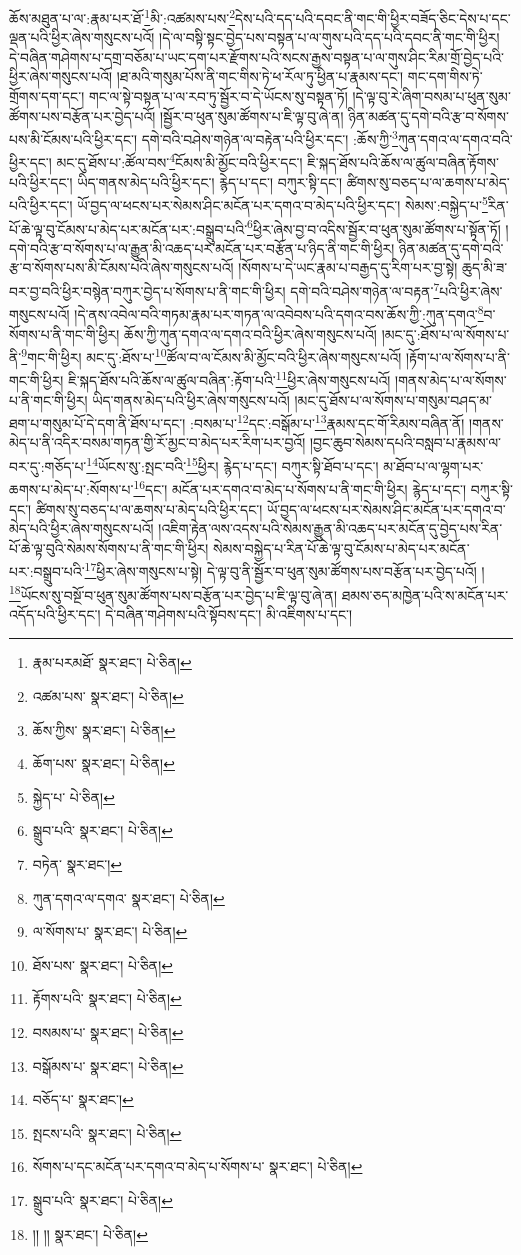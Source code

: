 ཆོས་མཐུན་པ་ལ་:རྣམ་པར་ཐོ་\footnote{རྣམ་པརམཐོ་  སྣར་ཐང་།  པེ་ཅིན། }མི་:འཚམས་པས་\footnote{འཚམ་པས་  སྣར་ཐང་།  པེ་ཅིན། }དེས་པའི་དད་པའི་དབང་ནི་གང་གི་ཕྱིར་བཟོད་ཅིང་དེས་པ་དང་ལྡན་པའི་ཕྱིར་ཞེས་གསུངས་པའོ། །དེ་ལ་བསྟི་སྟང་བྱེད་པས་བསྟན་པ་ལ་གུས་པའི་དད་པའི་དབང་ནི་གང་གི་ཕྱིར། དེ་བཞིན་གཤེགས་པ་དགྲ་བཅོམ་པ་ཡང་དག་པར་རྫོགས་པའི་སངས་རྒྱས་བསྟན་པ་ལ་གུས་ཤིང་རིམ་གྲོ་བྱེད་པའི་ཕྱིར་ཞེས་གསུངས་པའོ། །ཐ་མའི་གསུམ་པོས་ནི་གང་གིས་ཏེ་ཕ་རོལ་ཏུ་ཕྱིན་པ་རྣམས་དང་། གང་དག་གིས་ཏེ་གྲོགས་དག་དང་། གང་ལ་སྟེ་བསྟན་པ་ལ་རབ་ཏུ་སྦྱོར་བ་དེ་ཡོངས་སུ་བསྟན་ཏོ། །དེ་ལྟ་བུ་རེ་ཞིག་བསམ་པ་ཕུན་སུམ་ཚོགས་པས་བརྩོན་པར་བྱེད་པའོ། །སྦྱོར་བ་ཕུན་སུམ་ཚོགས་པ་ཇི་ལྟ་བུ་ཞེ་ན། ཉིན་མཚན་དུ་དགེ་བའི་རྩ་བ་སོགས་པས་མི་ངོམས་པའི་ཕྱིར་དང་། དགེ་བའི་བཤེས་གཉེན་ལ་བརྟེན་པའི་ཕྱིར་དང་། :ཆོས་ཀྱི་\footnote{ཆོས་ཀྱིས་  སྣར་ཐང་།  པེ་ཅིན། }ཀུན་དགའ་ལ་དགའ་བའི་ཕྱིར་དང་། མང་དུ་ཐོས་པ་:ཚོལ་བས་\footnote{ཆོག་པས་  སྣར་ཐང་།  པེ་ཅིན། }ངོམས་མི་མྱོང་བའི་ཕྱིར་དང་། ཇི་སྐད་ཐོས་པའི་ཆོས་ལ་ཚུལ་བཞིན་རྟོགས་པའི་ཕྱིར་དང་། ཡིད་གནས་མེད་པའི་ཕྱིར་དང་། རྙེད་པ་དང་། བཀུར་སྟི་དང་། ཚིགས་སུ་བཅད་པ་ལ་ཆགས་པ་མེད་པའི་ཕྱིར་དང་། ཡོ་བྱད་ལ་ཕངས་པར་སེམས་ཤིང་མངོན་པར་དགའ་བ་མེད་པའི་ཕྱིར་དང་། སེམས་:བསྐྱེད་པ་\footnote{སྐྱེད་པ་  པེ་ཅིན། }རིན་པོ་ཆེ་ལྟ་བུ་ངོམས་པ་མེད་པར་མངོན་པར་:བསྒྲུབ་པའི་\footnote{སྒྲུབ་པའི་  སྣར་ཐང་།  པེ་ཅིན། }ཕྱིར་ཞེས་བྱ་བ་འདིས་སྦྱོར་བ་ཕུན་སུམ་ཚོགས་པ་སྟོན་ཏོ། །དགེ་བའི་རྩ་བ་སོགས་པ་ལ་རྒྱུན་མི་འཆད་པར་མངོན་པར་བརྩོན་པ་ཉིད་ནི་གང་གི་ཕྱིར། ཉིན་མཚན་དུ་དགེ་བའི་རྩ་བ་སོགས་པས་མི་ངོམས་པའི་ཞེས་གསུངས་པའོ། །སོགས་པ་དེ་ཡང་རྣམ་པ་བརྒྱད་དུ་རིག་པར་བྱ་སྟེ། ཆུད་མི་ཟ་བར་བྱ་བའི་ཕྱིར་བསྙེན་བཀུར་བྱེད་པ་སོགས་པ་ནི་གང་གི་ཕྱིར། དགེ་བའི་བཤེས་གཉེན་ལ་བརྟན་\footnote{བཏེན་  སྣར་ཐང་། }པའི་ཕྱིར་ཞེས་གསུངས་པའོ། །དེ་ནས་འབེལ་བའི་གཏམ་རྣམ་པར་གཏན་ལ་འབེབས་པའི་དགའ་བས་ཆོས་ཀྱི་:ཀུན་དགའ་\footnote{ཀུན་དགའ་ལ་དགའ་  སྣར་ཐང་།  པེ་ཅིན། }བ་སོགས་པ་ནི་གང་གི་ཕྱིར། ཆོས་ཀྱི་ཀུན་དགའ་ལ་དགའ་བའི་ཕྱིར་ཞེས་གསུངས་པའོ། །མང་དུ་:ཐོས་པ་ལ་སོགས་པ་ནི་\footnote{ལ་སོགས་པ་  སྣར་ཐང་།  པེ་ཅིན། }གང་གི་ཕྱིར། མང་དུ་:ཐོས་པ་\footnote{ཐོས་པས་  སྣར་ཐང་།  པེ་ཅིན། }ཚོལ་བ་ལ་ངོམས་མི་མྱོང་བའི་ཕྱིར་ཞེས་གསུངས་པའོ། །རྟོག་པ་ལ་སོགས་པ་ནི་གང་གི་ཕྱིར། ཇི་སྐད་ཐོས་པའི་ཆོས་ལ་ཚུལ་བཞིན་:རྟོག་པའི་\footnote{རྟོགས་པའི་  སྣར་ཐང་།  པེ་ཅིན། }ཕྱིར་ཞེས་གསུངས་པའོ། །གནས་མེད་པ་ལ་སོགས་པ་ནི་གང་གི་ཕྱིར། ཡིད་གནས་མེད་པའི་ཕྱིར་ཞེས་གསུངས་པའོ། །མང་དུ་ཐོས་པ་ལ་སོགས་པ་གསུམ་བཤད་མ་ཐག་པ་གསུམ་པོ་དེ་དག་ནི་ཐོས་པ་དང་། :བསམ་པ་\footnote{བསམས་པ་  སྣར་ཐང་།  པེ་ཅིན། }དང་:བསྒོམ་པ་\footnote{བསྒོམས་པ་  སྣར་ཐང་།  པེ་ཅིན། }རྣམས་དང་གོ་རིམས་བཞིན་ནོ། །གནས་མེད་པ་ནི་འདིར་བསམ་གཏན་གྱི་རོ་མྱང་བ་མེད་པར་རིག་པར་བྱའོ། །བྱང་ཆུབ་སེམས་དཔའི་བསླབ་པ་རྣམས་ལ་བར་དུ་:གཅོད་པ་\footnote{བཅོད་པ་  སྣར་ཐང་། }ཡོངས་སུ་:སྤང་བའི་\footnote{སྤངས་པའི་  སྣར་ཐང་།  པེ་ཅིན། }ཕྱིར། རྙེད་པ་དང་། བཀུར་སྟི་ཐོབ་པ་དང་། མ་ཐོབ་པ་ལ་ལྷག་པར་ཆགས་པ་མེད་པ་:སོགས་པ་\footnote{སོགས་པ་དང་མངོན་པར་དགའ་བ་མེད་པ་སོགས་པ་  སྣར་ཐང་།  པེ་ཅིན། }དང་། མངོན་པར་དགའ་བ་མེད་པ་སོགས་པ་ནི་གང་གི་ཕྱིར། རྙེད་པ་དང་། བཀུར་སྟི་དང་། ཚིགས་སུ་བཅད་པ་ལ་ཆགས་པ་མེད་པའི་ཕྱིར་དང་། ཡོ་བྱད་ལ་ཕངས་པར་སེམས་ཤིང་མངོན་པར་དགའ་བ་མེད་པའི་ཕྱིར་ཞེས་གསུངས་པའོ། །འཇིག་རྟེན་ལས་འདས་པའི་སེམས་རྒྱུན་མི་འཆད་པར་མངོན་དུ་བྱེད་པས་རིན་པོ་ཆེ་ལྟ་བུའི་སེམས་སོགས་པ་ནི་གང་གི་ཕྱིར། སེམས་བསྐྱེད་པ་རིན་པོ་ཆེ་ལྟ་བུ་ངོམས་པ་མེད་པར་མངོན་པར་:བསྒྲུབ་པའི་\footnote{སྒྲུབ་པའི་  སྣར་ཐང་།  པེ་ཅིན། }ཕྱིར་ཞེས་གསུངས་པ་སྟེ། དེ་ལྟ་བུ་ནི་སྦྱོར་བ་ཕུན་སུམ་ཚོགས་པས་བརྩོན་པར་བྱེད་པའོ། །\footnote{།། །།  སྣར་ཐང་།  པེ་ཅིན། }ཡོངས་སུ་བསྔོ་བ་ཕུན་སུམ་ཚོགས་པས་བརྩོན་པར་བྱེད་པ་ཇི་ལྟ་བུ་ཞེ་ན། ཐམས་ཅད་མཁྱེན་པའི་ས་མངོན་པར་འདོད་པའི་ཕྱིར་དང་། དེ་བཞིན་གཤེགས་པའི་སྟོབས་དང་། མི་འཇིགས་པ་དང་། 